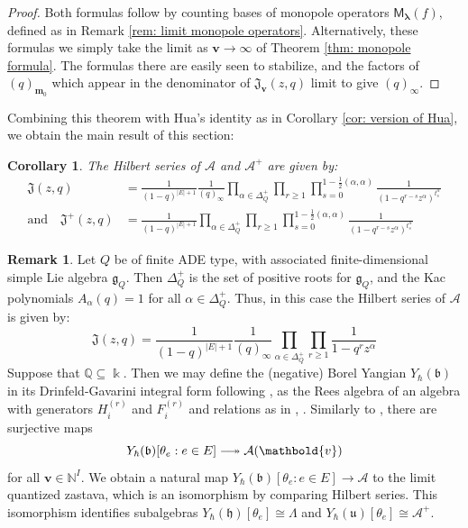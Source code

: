 \documentclass[11pt,reqno]{amsart}
\renewcommand{\mathbf}{\mathbold}
\numberwithin{equation}{section}
\newtheorem{Corollary}[equation]{Corollary}
\theoremstyle{definition}
\newtheorem{Remark}[equation]{Remark}
\newcommand{\cA}{\mathcal{A}}
\newcommand{\fJ}{\mathfrak{J}}
\newcommand{\fb}{\mathfrak{b}}
\newcommand{\fg}{\mathfrak{g}}
\newcommand{\fh}{\mathfrak{h}}
\newcommand{\bm}{\mathbf{m}}
\newcommand{\fu}{\mathfrak{u}}
\newcommand{\bv}{\mathbf{v}}
\newcommand{\NN}{\mathbb{N}}
\newcommand{\QQ}{\mathbb{Q}}
\newcommand{\twoheadlongrightarrow}{\relbar\joinrel\twoheadrightarrow}
\newcommand{\kk}{\Bbbk}
\renewcommand{\bv}{\mathbf{v}} %
\newcommand{\M}{\mathsf{M}}
\newcommand{\quiver}{Q}
\newcommand{\vertexset}{I}
\newcommand{\arrowset}{E}
\newcommand{\GT}{\Lambda}
\newcommand{\bla}{{\boldsymbol{\lambda}}}
\newcommand{\qzast}{\cA}
\newcommand{\qzastplus}{\cA^{+}}
\begin{document}
\begin{proof}
Both formulas follow by counting bases of monopole operators $\M_\bla(f)$, defined as in Remark \ref{rem: limit monopole operators}.  Alternatively, these formulas we  simply take  the limit as $\bv \rightarrow \infty$ of  Theorem \ref{thm: monopole formula}. The formulas there  are easily seen to stabilize, and the factors of $(q)_{\bm_0}$ which appear in the denominator of $\fJ_\bv(z,q)$ limit to give $(q)_{\boldsymbol{\infty}}$.

\end{proof}

Combining this theorem with Hua's identity as in Corollary \ref{cor: version of Hua}, we obtain the main result of this section:
\begin{Corollary}
    \label{cor:HilbandKac}
    The Hilbert series of $\qzast$ and $\qzastplus$ are given by:
    \begin{align*}
        \fJ(z,q) & = \frac{1}{(1-q)^{|\arrowset|+1}}  \frac{1}{(q)_{\boldsymbol{\infty}}} \prod_{\alpha \in \Delta_Q^+} \prod_{r\geq 1} \prod_{s=0}^{1 - \frac{1}{2} (\alpha,\alpha)} \frac{1}{( 1 -  q^{r-s} z^\alpha)^{t_s^\alpha}} \\
        \text{and} \quad  \fJ^+(z,q) & = \frac{1}{(1-q)^{|\arrowset|+1}}   \prod_{\alpha \in \Delta_Q^+} \prod_{r\geq 1} \prod_{s=0}^{1 - \frac{1}{2} (\alpha,\alpha)} \frac{1}{( 1 -  q^{r-s} z^\alpha)^{t_s^\alpha}}
    \end{align*}
\end{Corollary}

\begin{Remark}
    \label{rmk:finiteADE}
    Let $\quiver$ be of finite ADE type, with associated finite-dimensional simple Lie algebra $\fg_\quiver$.  Then $\Delta^+_\quiver$ is the set of positive roots for $\fg_\quiver$, and the Kac polynomials $A_\alpha(q) = 1$ for all $\alpha \in \Delta_\quiver^+$. Thus, in this case the Hilbert series of $\qzast$ is given by:
    $$
    \fJ(z,q) = \frac{1}{(1-q)^{|\arrowset|+1}} \frac{1}{(q)_{\boldsymbol{\infty}}} \prod_{\alpha \in \Delta^+_\quiver} \prod_{r\geq 1} \frac{1}{1-q^r z^\alpha}
    $$
    Suppose that $\QQ \subseteq \kk$. Then we may define the (negative) Borel Yangian $Y_\hbar(\fb)$ in its Drinfeld-Gavarini integral form following \cite[\S 5.4]{FKPRW}, as the Rees algebra of an algebra with generators $H_i^{(r)}$ and $F_i^{(r)}$ and relations as in \cite[Definition 3.1]{FKPRW}, \cite[\S A.5]{FT2}. Similarly to \cite[Appendix B]{BFN2}, there are surjective maps 
    $$
    Y_\hbar(\fb)[\theta_e : e \in \arrowset] \twoheadlongrightarrow \qzast(\bv)
    $$
    for all $\bv \in \NN^\vertexset$. We obtain a natural map $Y_\hbar(\fb)[\theta_e : e \in \arrowset] \longrightarrow \qzast$ to the limit quantized zastava, which is an isomorphism by comparing Hilbert series.  This isomorphism identifies subalgebras $Y_\hbar(\fh)[\theta_e] \cong \GT$ and $Y_\hbar(\fu)[\theta_e] \cong \qzastplus$.
\end{Remark}
\end{document}
